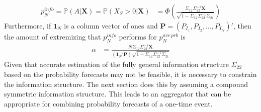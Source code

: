 \documentclass[11pt]{article}
\renewcommand{\P}{\mathbb{P}}
\theoremstyle{definition}
\theoremstyle{definition}
\begin{document}
\begin{align}
p_N^{info} = \P\left(A  | \boldsymbol{X}\right)  = \P\left(X_{S} > 0 | \boldsymbol{X}\right) &= \Phi\left( \frac{\Sigma_{12} \Sigma_{22}^{-1} \boldsymbol{X}}{\sqrt{1 - \Sigma_{12} \Sigma_{22}^{-1} \Sigma_{21}}}\right) \label{GeneralAggregator}
\end{align}
Furthermore, if $\boldsymbol{1}_N$ is a column vector of ones and $\boldsymbol{P} = (P_{I_1}, P_{I_2}, \dots, P_{I_N})'$, then the amount of extremizing that $p_N^{info}$ performs for $p_{N}^{ave\ prb}$ is
\begin{align}
\alpha  &= \frac{N \Sigma_{12} \Sigma_{22}^{-1} \boldsymbol{X}}{\left(\boldsymbol{1}_N' \boldsymbol{P} \right) \sqrt{1 - \Sigma_{12} \Sigma_{22}^{-1} \Sigma_{21}}} \label{alpha}
\end{align}
Given that accurate estimation of the fully general information structure $\Sigma_{22}$ based on the probability forecasts may not be feasible, it is necessary to constrain the information structure. The next section does this by assuming a compound symmetric information structure. This leads to an aggregator that can be appropriate for combining probability forecasts of a one-time event. 



\end{document}
